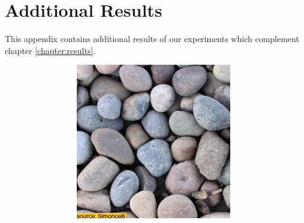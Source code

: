 \chapter{Additional Results}
\label{chapter:appendix-results}

This appendix contains additional results of our experiments which complement chapter \ref{chapter:results}.

\begin{figure}[]
    \centering    
    \begin{subfigure}{\textwidth}
        \centering
        \begin{subfigure}{0.24\textwidth}
            \centering
            \includegraphics[width=\textwidth]{images/04-experiment01/pebbles/target.jpg}
        \end{subfigure}
        \hfill
        \begin{subfigure}{0.24\textwidth}
            \centering

\end{subfigure}
\end{subfigure}
\end{figure}
